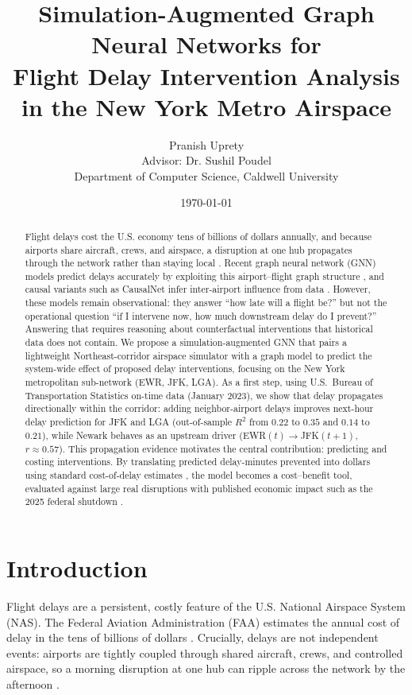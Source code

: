 \documentclass[11pt]{article}
\title{Simulation-Augmented Graph Neural Networks for\\
Flight Delay Intervention Analysis in the New York Metro Airspace}
\author{Pranish Uprety \\ Advisor: Dr. Sushil Poudel \\
Department of Computer Science, Caldwell University}
\date{\today}
\begin{document}
\maketitle

\begin{abstract}
Flight delays cost the U.S. economy tens of billions of dollars annually, and
because airports share aircraft, crews, and airspace, a disruption at one hub
propagates through the network rather than staying local \cite{fleurquin2013}.
Recent graph neural network (GNN) models predict delays accurately by exploiting
this airport--flight graph structure \cite{cai2023, zeng2021, jiang2022}, and
causal variants such as CausalNet infer inter-airport influence from data
\cite{zhu2024}. However, these models remain observational: they answer
``how late will a flight be?'' but not the operational question ``if I intervene
now, how much downstream delay do I prevent?'' Answering that requires reasoning
about counterfactual interventions that historical data does not contain. We
propose a simulation-augmented GNN that pairs a lightweight Northeast-corridor
airspace simulator with a graph model to predict the system-wide effect of
proposed delay interventions, focusing on the New York metropolitan sub-network
(EWR, JFK, LGA). As a first step, using U.S.\ Bureau of Transportation Statistics
on-time data (January 2023), we show that delay propagates directionally within
the corridor: adding neighbor-airport delays improves next-hour delay prediction
for JFK and LGA (out-of-sample $R^2$ from $0.22$ to $0.35$ and $0.14$ to $0.21$),
while Newark behaves as an upstream driver (EWR$(t)\rightarrow$JFK$(t{+}1)$,
$r\approx0.57$). This propagation evidence motivates the central contribution:
predicting and costing interventions. By translating predicted delay-minutes
prevented into dollars using standard cost-of-delay estimates \cite{faacost2023},
the model becomes a cost--benefit tool, evaluated against large real disruptions
with published economic impact such as the 2025 federal shutdown
\cite{richmondfed2025, ctp2026}.
\end{abstract}

\section{Introduction}
Flight delays are a persistent, costly feature of the U.S. National Airspace
System (NAS). The Federal Aviation Administration (FAA) estimates the annual cost
of delay in the tens of billions of dollars \cite{faacost2023}. Crucially,
delays are not independent events: airports are tightly coupled through shared
aircraft, crews, and controlled airspace, so a morning disruption at one hub can
ripple across the network by the afternoon \cite{fleurquin2013}.
\end{document}
